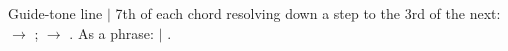 \begin{patternbox}{Guide-tone line}{  $|$ }
7th of each chord resolving down a step to the 3rd of the next:
  $\to$  ;   $\to$  .
As a phrase:  $|$ .
\patternwhereline
\end{patternbox}
